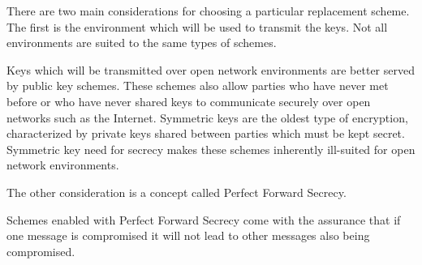 There are two main considerations for choosing a particular replacement scheme. 
\newline 
The first is the environment which will be used to transmit the keys.  
Not all environments are suited to the same types of schemes.

Keys which will be transmitted over open network environments are better served by public key schemes. 
These schemes also allow parties who have never met before or who have never shared keys to communicate securely over open networks such as the Internet.  
Symmetric keys are the oldest type of encryption, characterized by private keys shared between parties which must be kept secret. 
Symmetric key need for secrecy makes these schemes inherently ill-suited for open network environments. 

The other consideration is a concept called Perfect Forward Secrecy.

Schemes enabled with Perfect Forward Secrecy come with the assurance that if one message is compromised it will not lead to other messages also being compromised.
